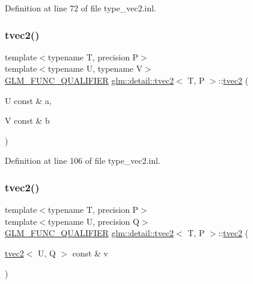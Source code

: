 Definition at line 72 of file type\+\_\+vec2.\+inl.

\mbox{\label{structglm_1_1detail_1_1tvec2_a1057576a2eab171002a8ff2bf4bd68ad}} 
\subsubsection{\texorpdfstring{tvec2()}{tvec2()}\hspace{0.1cm}{\footnotesize\ttfamily [12/15]}}
{\footnotesize\ttfamily template$<$typename T, precision P$>$ \\
template$<$typename U, typename V$>$ \\
\hyperlink{setup_8hpp_a33fdea6f91c5f834105f7415e2a64407}{G\+L\+M\+\_\+\+F\+U\+N\+C\+\_\+\+Q\+U\+A\+L\+I\+F\+I\+ER} \hyperlink{structglm_1_1detail_1_1tvec2}{glm\+::detail\+::tvec2}$<$ T, P $>$\+::\hyperlink{structglm_1_1detail_1_1tvec2}{tvec2} (\begin{DoxyParamCaption}\item[{U const \&}]{a,  }\item[{V const \&}]{b }\end{DoxyParamCaption})}



Definition at line 106 of file type\+\_\+vec2.\+inl.

\mbox{\label{structglm_1_1detail_1_1tvec2_a8ea4daf34f1286102f8a0fc565b1376d}} 
\subsubsection{\texorpdfstring{tvec2()}{tvec2()}\hspace{0.1cm}{\footnotesize\ttfamily [13/15]}}
{\footnotesize\ttfamily template$<$typename T, precision P$>$ \\
template$<$typename U, precision Q$>$ \\
\hyperlink{setup_8hpp_a33fdea6f91c5f834105f7415e2a64407}{G\+L\+M\+\_\+\+F\+U\+N\+C\+\_\+\+Q\+U\+A\+L\+I\+F\+I\+ER} \hyperlink{structglm_1_1detail_1_1tvec2}{glm\+::detail\+::tvec2}$<$ T, P $>$\+::\hyperlink{structglm_1_1detail_1_1tvec2}{tvec2} (\begin{DoxyParamCaption}\item[{\hyperlink{structglm_1_1detail_1_1tvec2}{tvec2}$<$ U, Q $>$ const \&}]{v }\end{DoxyParamCaption})}



